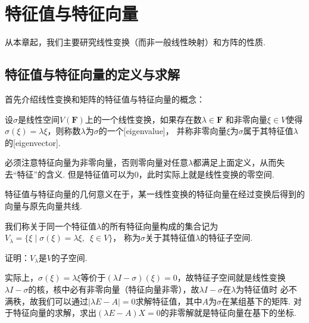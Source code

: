 \section{特征值与特征向量}
从本章起，我们主要研究线性变换（而非一般线性映射）和方阵的性质.
\subsection{特征值与特征向量的定义与求解}
首先介绍线性变换和矩阵的特征值与特征向量的概念：
\begin{definition}
    设$\sigma$是线性空间$V(\mathbf{F})$上的一个线性变换，如果存在数$\lambda\in\mathbf{F}$
    和非零向量$\xi\in V$使得$\sigma(\xi)=\lambda\xi$，则称数$\lambda$为$\sigma$的一个[eigenvalue]，
    并称非零向量$\xi$为$\sigma$属于其特征值$\lambda$的[eigenvector].
\end{definition}
必须注意特征向量为非零向量，否则零向量对任意$\lambda$都满足上面定义，从而失去``特征''的含义.
但是特征值可以为0，此时实际上就是线性变换的零空间.

特征值与特征向量的几何意义在于，某一线性变换的特征向量在经过变换后得到的向量与原先向量共线.

我们称关于同一个特征值$\lambda$的所有特征向量构成的集合记为$V_\lambda=\{\xi \mid \sigma(\xi)=\lambda\xi,\enspace\xi\in V\}$，
称为$\sigma$关于其特征值$\lambda$的特征子空间.
\begin{example}
    证明：$V_\lambda$是$V$的子空间.
\end{example}
实际上，$\sigma(\xi)=\lambda\xi$等价于$(\lambda I-\sigma)(\xi)=0$，故特征子空间就是线性变换
$\lambda I-\sigma$的核，核中必有非零向量（特征向量非零），故$\lambda I-\sigma$在$\lambda$为特征值时
必不满秩，故我们可以通过$|\lambda E-A|=0$求解特征值，其中$A$为$\sigma$在某组基下的矩阵.
对于特征向量的求解，求出$(\lambda E-A)X=0$的非零解就是特征向量在基下的坐标.

